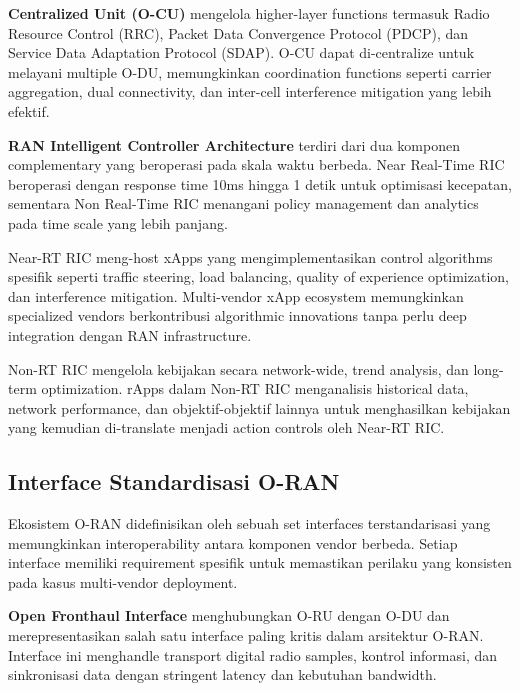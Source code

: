 \textbf{Centralized Unit (O-CU)} mengelola higher-layer functions termasuk Radio Resource Control (RRC), Packet Data Convergence Protocol (PDCP), dan Service Data Adaptation Protocol (SDAP). O-CU dapat di-centralize untuk melayani multiple O-DU, memungkinkan coordination functions seperti carrier aggregation, dual connectivity, dan inter-cell interference mitigation yang lebih efektif.

\textbf{RAN Intelligent Controller Architecture} terdiri dari dua komponen complementary yang beroperasi pada skala waktu berbeda. Near Real-Time RIC beroperasi dengan response time 10ms hingga 1 detik untuk optimisasi kecepatan, sementara Non Real-Time RIC menangani policy management dan analytics pada time scale yang lebih panjang.

Near-RT RIC meng-host xApps yang mengimplementasikan control algorithms spesifik seperti traffic steering, load balancing, quality of experience optimization, dan interference mitigation. Multi-vendor xApp ecosystem memungkinkan specialized vendors berkontribusi algorithmic innovations tanpa perlu deep integration dengan RAN infrastructure.

Non-RT RIC mengelola kebijakan secara network-wide, trend analysis, dan long-term optimization. rApps dalam Non-RT RIC menganalisis historical data, network performance, dan objektif-objektif lainnya untuk menghasilkan kebijakan yang kemudian di-translate menjadi action controls oleh Near-RT RIC.

\subsection{Interface Standardisasi O-RAN}

Ekosistem O-RAN didefinisikan oleh sebuah set interfaces terstandarisasi yang memungkinkan interoperability antara komponen vendor berbeda. Setiap interface memiliki requirement spesifik untuk memastikan perilaku yang konsisten pada kasus multi-vendor deployment.


\textbf{Open Fronthaul Interface} menghubungkan O-RU dengan O-DU dan merepresentasikan salah satu interface paling kritis dalam arsitektur O-RAN. Interface ini menghandle transport digital radio samples, kontrol informasi, dan sinkronisasi data dengan stringent latency dan kebutuhan bandwidth.

